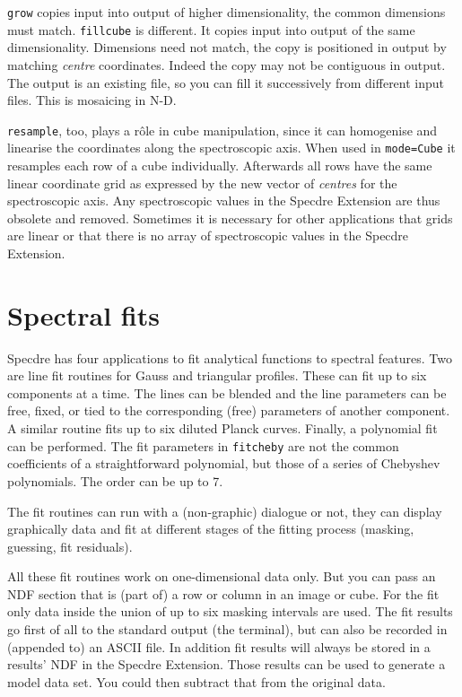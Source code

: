 {\tt grow} copies input into output of higher dimensionality, the
common dimensions must match.  {\tt fillcube} is different.  It
copies input into output of the same dimensionality.  Dimensions need
not match, the copy is positioned in output by matching {\it centre}
coordinates.  Indeed the copy may not be contiguous in output.  The
output is an existing file, so you can fill it successively from
different input files.  This is mosaicing in N-D.

{\tt resample}, too, plays a r\^ole in cube manipulation, since it
can homogenise and linearise the coordinates along the spectroscopic
axis.  When used in {\tt mode=Cube} it resamples each row of a cube
individually.  Afterwards all rows have the same linear coordinate
grid as expressed by the new vector of {\it centres} for the
spectroscopic axis.  Any spectroscopic values in the Specdre
Extension are thus obsolete and removed.  Sometimes it is necessary
for other applications that grids are linear or that there is no
array of spectroscopic values in the Specdre Extension.


\goodbreak
\section{Spectral fits}
\label{specfit}

Specdre has four applications to fit analytical functions to spectral
features. Two are line fit routines for Gauss and triangular profiles.
These can fit up to six components at a time. The lines can be blended
and the line parameters can be free, fixed, or tied to the corresponding
(free) parameters of another component. A similar routine fits up to six
diluted Planck curves.  Finally, a polynomial fit can be performed. The
fit parameters in {\tt fitcheby} are not the common coefficients of a
straightforward polynomial, but those of a series of Chebyshev
polynomials. The order can be up to 7.

The fit routines can run with a (non-graphic) dialogue or not, they can
display graphically data and fit at different stages of the fitting
process (masking, guessing, fit residuals).

All these fit routines work on one-dimensional data only. But you can
pass an NDF section that is (part of) a row or column in an image or
cube. For the fit only data inside the union of up to six masking
intervals are used. The fit results go first of all to the standard
output (the terminal), but can also be recorded in (appended to) an
ASCII file. In addition fit results will always be stored in a results'
NDF in the Specdre Extension. Those results can be used to generate a
model data set. You could then subtract that from the original data.

